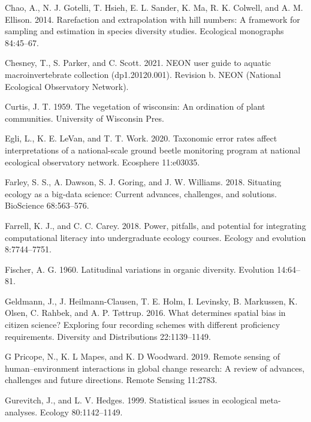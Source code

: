 \documentclass[
  12pt,
]{article}
\newlength{\cslhangindent}
\newenvironment{cslreferences}%
  {\setlength{\parindent}{0pt}%
  \everypar{\setlength{\hangindent}{\cslhangindent}}\ignorespaces}%
  {\par}
\begin{document}
\begin{cslreferences}
\leavevmode\hypertarget{ref-chao2014rarefaction}{}%
Chao, A., N. J. Gotelli, T. Hsieh, E. L. Sander, K. Ma, R. K. Colwell, and A. M. Ellison. 2014. Rarefaction and extrapolation with hill numbers: A framework for sampling and estimation in species diversity studies. Ecological monographs 84:45--67.

\leavevmode\hypertarget{ref-Chesney2021}{}%
Chesney, T., S. Parker, and C. Scott. 2021. NEON user guide to aquatic macroinvertebrate collection (dp1.20120.001). Revision b. NEON (National Ecological Observatory Network).

\leavevmode\hypertarget{ref-curtis1959vegetation}{}%
Curtis, J. T. 1959. The vegetation of wisconsin: An ordination of plant communities. University of Wisconsin Pres.

\leavevmode\hypertarget{ref-egli2020taxonomic}{}%
Egli, L., K. E. LeVan, and T. T. Work. 2020. Taxonomic error rates affect interpretations of a national-scale ground beetle monitoring program at national ecological observatory network. Ecosphere 11:e03035.

\leavevmode\hypertarget{ref-farley2018situating}{}%
Farley, S. S., A. Dawson, S. J. Goring, and J. W. Williams. 2018. Situating ecology as a big-data science: Current advances, challenges, and solutions. BioScience 68:563--576.

\leavevmode\hypertarget{ref-farrell2018power}{}%
Farrell, K. J., and C. C. Carey. 2018. Power, pitfalls, and potential for integrating computational literacy into undergraduate ecology courses. Ecology and evolution 8:7744--7751.

\leavevmode\hypertarget{ref-fischer1960latitudinal}{}%
Fischer, A. G. 1960. Latitudinal variations in organic diversity. Evolution 14:64--81.

\leavevmode\hypertarget{ref-geldmann2016determines}{}%
Geldmann, J., J. Heilmann-Clausen, T. E. Holm, I. Levinsky, B. Markussen, K. Olsen, C. Rahbek, and A. P. Tøttrup. 2016. What determines spatial bias in citizen science? Exploring four recording schemes with different proficiency requirements. Diversity and Distributions 22:1139--1149.

\leavevmode\hypertarget{ref-g2019remote}{}%
G Pricope, N., K. L Mapes, and K. D Woodward. 2019. Remote sensing of human--environment interactions in global change research: A review of advances, challenges and future directions. Remote Sensing 11:2783.

\leavevmode\hypertarget{ref-gurevitch1999statistical}{}%
Gurevitch, J., and L. V. Hedges. 1999. Statistical issues in ecological meta-analyses. Ecology 80:1142--1149.


\end{cslreferences}
\end{document}
